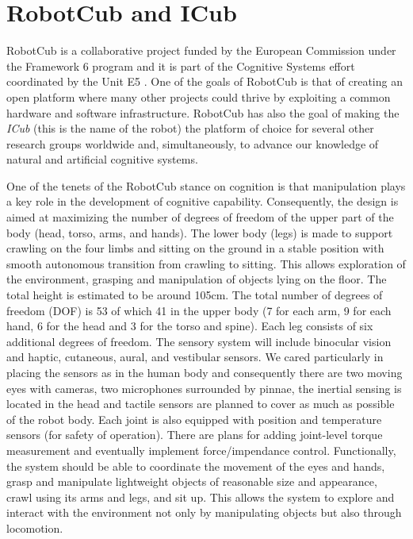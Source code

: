 
\section{RobotCub and ICub}
RobotCub is a collaborative project funded by the European Commission under 
the Framework 6 program and it is part of the Cognitive Systems effort 
coordinated by the Unit E5 \cite{e5-cognition}.
One of the goals of RobotCub is that of creating an open platform where
many other projects could thrive by exploiting a common hardware and software
infrastructure. RobotCub has also the goal of making the {\em ICub} (this is 
the name of the robot) the platform of choice for several other research
groups worldwide and, simultaneously, to advance our knowledge of natural and
artificial cognitive systems.

One of the tenets of the RobotCub stance on cognition is that manipulation 
plays a key role in the development of cognitive capability. Consequently, 
the design is aimed at maximizing the number of degrees of freedom of the upper 
part of the body (head, torso, arms, and hands). The lower body (legs) is made 
to support crawling on the four limbs and sitting on the ground in a stable 
position with smooth autonomous transition from crawling to sitting. This  
allows exploration of the environment, grasping and manipulation of objects 
lying on the floor. The total height is estimated to be around 105cm. The 
total number of degrees of freedom (DOF) is 53 of which 41 in the upper body 
(7 for each arm, 9 for each hand, 6 for the head and 3 for the torso and spine). 
Each leg consists of six additional degrees of freedom. The sensory system will 
include binocular vision and haptic, cutaneous, aural, and vestibular sensors.
We cared particularly in placing the sensors as in the human body and consequently 
there are two moving eyes with cameras, two microphones surrounded by pinnae, the
inertial sensing is located in the head and tactile sensors are planned to cover 
as much as possible of the robot body. Each joint is also equipped with position
and temperature sensors (for safety of operation). There are plans for adding 
joint-level torque measurement and eventually implement force/impendance control.
Functionally, the system should be able to coordinate the movement of the eyes 
and hands, grasp and manipulate lightweight objects of reasonable size and 
appearance, crawl using its arms and legs, and sit up. This allows the system 
to explore and interact with the environment not only by manipulating objects 
but also through locomotion.

